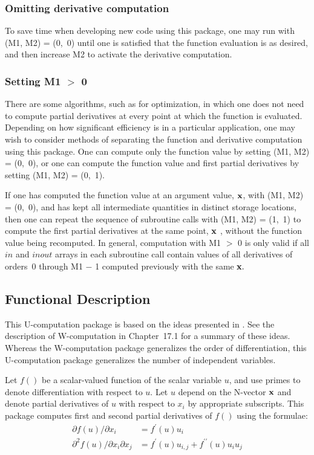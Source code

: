 \documentclass[twoside]{MATH77}
\begin{document}
\subsubsection{Omitting derivative computation}

To save time when developing new code using this package, one may run with
(M1, M2) = (0,~0) until one is satisfied that the function evaluation is as
desired, and then increase M2 to activate the derivative computation.

\subsubsection{Setting M1 $>$ 0}

There are some algorithms, such as for optimization, in which one does not
need to compute partial derivatives at every point at which the function is
evaluated. Depending on how significant efficiency is in a particular
application, one may wish to consider methods of separating the function and
derivative computation using this package. One can compute only the function
value by setting (M1, M2) = (0,~0), or one can compute the function value
and first partial derivatives by setting (M1, M2) = (0,~1).

If one has computed the function value at an argument value, ${\bf x}$, with (M1,
M2) = (0,~0), and has kept all intermediate quantities in distinct storage
locations, then one can repeat the sequence of subroutine calls with (M1,
M2) = (1,~1) to compute the first partial derivatives at the same point,
${\bf x}$%
, without the function value being recomputed. In general, computation with
M1 $>$ 0 is only valid if all $in$ and $inout$ arrays in each subroutine call
contain values of all derivatives of orders~0 through M1 $-$ 1 computed
previously with the same ${\bf x}.$

\subsection{Functional Description}

This U-computation package is based on the ideas presented in
\cite{Wengert:1964:ASA}.  See the description of W-computation in
Chapter~17.1 for a summary of these ideas.  Whereas the W-computation
package generalizes the order of differentiation, this U-computation
package generalizes the number of independent variables.

Let $f()$ be a scalar-valued function of the scalar variable $u$, and use
primes to denote differentiation with respect to $u$. Let $u$ depend on the
N-vector ${\bf x}$ and denote partial derivatives of $u$ with respect to $x_i$ by
appropriate subscripts. This package computes first and second partial
derivatives of $f()$ using the formulae:
\begin{align*}
\partial f(u)/\partial x_i &= f^{\prime}(u) u_i\\
\partial ^2f(u)/\partial x_i\partial x_j &= f^{\prime}(u) u_{i,j} +
f^{\prime\prime}(u) u_i u_j
\end{align*}
\end{document}
